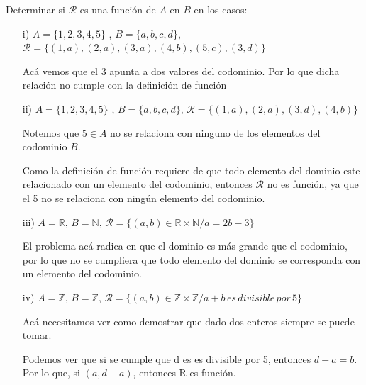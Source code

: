 \documentclass[10pt]{article}
\begin{document}
\begin{ej}
Determinar si $\mathcal{R}$ es una función de $A$ en $B$ en los casos: 
\begin{itemize}
	\item[i)] $A = \{ 1,2,3,4,5 \}$ , $B = \{ a,b,c,d \}$, $\mathcal{R} = \{ (1,a), (2,a), (3,a), (4,b), (5,c), (3,d)\}$
	
	Acá vemos que el $3$ apunta a dos valores del codominio. Por lo que dicha relación no cumple con la definición de función
	\item[ii)] $A = \{ 1,2,3,4,5 \}$ , $B = \{ a,b,c,d \}$, $\mathcal{R} = \{ (1,a), (2,a), (3,d), (4,b)\}$
	
	Notemos que $5 \in A$ no se relaciona con ninguno de los elementos del codominio $B$. 
	
	Como la definición de función requiere de que todo elemento del dominio este relacionado con un elemento del codominio, entonces $\mathcal{R}$ no es función, ya que el 5 no se relaciona con ningún elemento del codominio.
	\item[iii)] $A = \mathbb{R}$, $B = \mathbb{N}$, $\mathcal{R} = \{ (a, b) \in \mathbb{R} \times \mathbb{N} / a = 2b - 3\}$
	
	El problema acá radica en que el dominio es más grande que el codominio, por lo que no se cumpliera que todo elemento del dominio se corresponda con un elemento del codominio.	
	
	\item[iv)] $A = \mathbb{Z}$, $B = \mathbb{Z}$, $\mathcal{R} = \{ (a, b) \in \mathbb{Z} \times \mathbb{Z} / a + b \, es \, divisible \, por \, 5\}$
	
	Acá necesitamos ver como demostrar que dado dos enteros siempre se puede tomar.
	
	Podemos ver que si se cumple que d es es divisible por 5, entonces $d - a = b$. 
	Por lo que, si $(a, d-a)$, entonces R es función.  
\end{itemize}
\end{ej}
\end{document}
